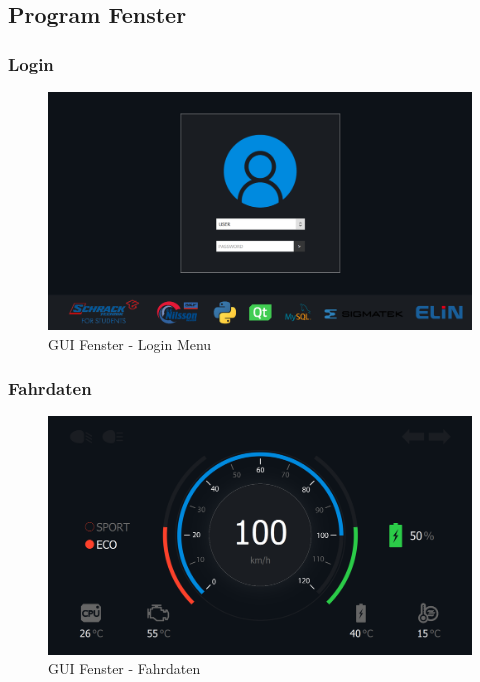 \newpage

\subsection{Program Fenster}

\subsubsection{Login}

\begin{figure}[H]
	\begin{center}
		\includegraphics[scale=0.24]{figures/hcis/window_login.png}
			\caption{GUI Fenster - Login Menu}
			\label{fig:pageMenu}
	\end{center}
\end{figure}

\subsubsection{Fahrdaten}

\begin{figure}[H]
	\begin{center}
		\includegraphics[scale=0.24]{figures/hcis/window_dashboard.png}
			\caption{GUI Fenster - Fahrdaten}
			\label{fig:pageDash}
	\end{center}
\end{figure}

